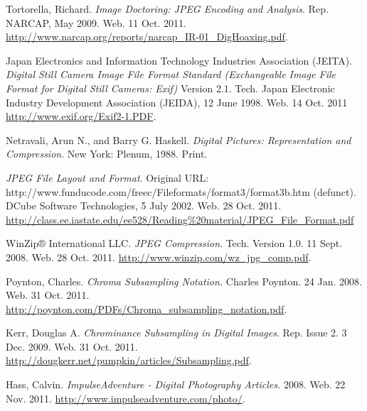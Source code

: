 \documentclass[oneside]{ecsgdp}         %
\begin{document}
\begin{thebibliography}{9}

	 Tortorella, Richard. \emph{Image Doctoring: JPEG Encoding and Analysis}. Rep. NARCAP, May 2009. Web. 11 Oct. 2011. \url{http://www.narcap.org/reports/narcap_IR-01_DigHoaxing.pdf}.
	
	 Japan Electronics and Information Technology Industries Association (JEITA). \emph{Digital Still Camera Image File Format Standard (Exchangeable Image File Format for Digital Still Cameras: Exif)} Version 2.1. Tech. Japan Electronic Industry Development Association (JEIDA), 12 June 1998. Web. 14 Oct. 2011 \url{http://www.exif.org/Exif2-1.PDF}.
	
	 Netravali, Arun N., and Barry G. Haskell. \emph{Digital Pictures: Representation and Compression}. New York: Plenum, 1988. Print. 
	
	 \emph{JPEG File Layout and Format}. Original URL: \\http://www.funducode.com/freec/Fileformats/format3/format3b.htm (defunct).\\DCube Software Technologies, 5 July 2002. Web. 28 Oct. 2011. \url{http://class.ee.iastate.edu/ee528/Reading%20material/JPEG_File_Format.pdf}
	
	 WinZip® International LLC. \emph{JPEG Compression}. Tech. Version 1.0. 11 Sept. 2008. Web. 28 Oct. 2011. \url{http://www.winzip.com/wz_jpg_comp.pdf}.
	
	 Poynton, Charles. \emph{Chroma Subsampling Notation.} Charles Poynton. 24 Jan. 2008. Web. 31 Oct. 2011. \url{http://poynton.com/PDFs/Chroma_subsampling_notation.pdf}.
	
	 Kerr, Douglas A. \emph{Chrominance Subsampling in Digital Images}. Rep. Issue 2. 3 Dec. 2009. Web. 31 Oct. 2011. \url{http://dougkerr.net/pumpkin/articles/Subsampling.pdf}.
	
	 Hass, Calvin. \emph{ImpulseAdventure - Digital Photography Articles.} 2008. Web. 22 Nov. 2011. \url{http://www.impulseadventure.com/photo/}.

\end{thebibliography}
\end{document}
